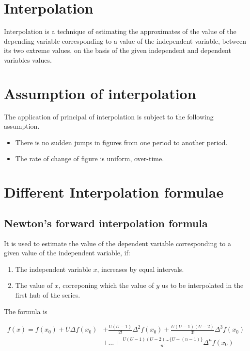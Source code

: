 \documentclass[11pt, a4paper, oneside]{book}
\begin{document}


       \section{Interpolation}
         Interpolation is a technique of estimating the approximates of the value
         of the depending variable corresponding to a value of the independent variable,
         between its two extreme values, on the basis of the given independent and
         dependent variables values.

       \section{Assumption of interpolation}
         The application of principal of interpolation is subject to the following assumption.
         \begin{itemize}
           \item There is no sudden jumps in figures from one period to another period.

           \item The rate of change of figure is uniform, over-time.

         \end{itemize}
       \section{Different Interpolation formulae}
         \subsection{Newton's forward interpolation formula}
           It is used to estimate the value of the dependent variable corresponding to
           a given value of the independent variable, if:

           \begin{enumerate}
             \item The independent variable $x$, increases by equal intervals.
             \item The value of $x$, correponing which the value of $y$ us to be interpolated in the first hub of the series.
           \end{enumerate}

           The formula is

           \begin{align*}
             f(x)=f(x_0)+U\Delta f(x_0)&+\frac{U(U-1)}{2!}\Delta^2f(x_0)+\frac{U(U-1)(U-2)}{3!}\Delta^3f(x_0)\\
             &+\dots+\frac{U(U-1)(U-2)\dots\{U-(n-1)\}}{n!}\Delta^nf(x_0)\\
           \end{align*}
\end{document}
